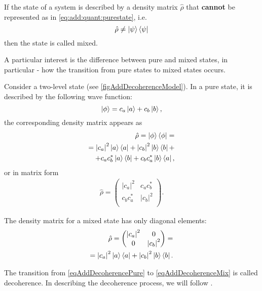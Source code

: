 \begin{definition}
If the state of a system is described by a density matrix $\hat{\rho}$ that \textbf{cannot} be represented as in \eqref{eq:add:quant:purestate}, i.e. 
\[
\hat{\rho} \ne \ket{\psi}\bra{\psi}
\]
then the state is called mixed.
\end{definition}

A particular interest is the difference between pure and mixed states, in particular - how the transition from pure states to mixed states occurs.

Consider a two-level state (see \autoref{figAddDecoherenceModel}). In a pure state, it is described by the following wave function:
\begin{equation}
\left|\phi\right> = c_a \ket{a } + c_b \ket{b},
\nonumber
\end{equation}
the corresponding density matrix appears as
\begin{eqnarray}
\hat{\rho} = \left|\phi\right>\left<\phi\right| =
\nonumber \\
= 
\left|c_a\right|^2 \ket{a}\bra{a} + 
\left|c_b\right|^2 \ket{b}\bra{b} +
\nonumber \\
+
c_a c_b^{\ast}\ket{a}\bra{b} +
c_b c_a^{\ast}\ket{b}\bra{a},
\label{eqAddDecoherencePure}
\end{eqnarray}
or in matrix form
\begin{eqnarray}
\hat{\rho} = 
\begin{pmatrix}
\left|c_a\right|^2 & c_a c_b^{\ast} \\
c_b c_a^{\ast} & \left|c_b\right|^2 \\
\end{pmatrix}.
\nonumber
\end{eqnarray}

The density matrix 
for a mixed state has only diagonal elements:
\begin{eqnarray}
\hat{\rho} = 
\begin{pmatrix}
\left|c_a\right|^2 & 0 \\
0 & \left|c_b\right|^2 \\
\end{pmatrix} = 
\nonumber \\
=
\left|c_a\right|^2 \ket{a}\bra{a} + 
\left|c_b\right|^2 \ket{b}\bra{b}.
\label{eqAddDecoherenceMix}
\end{eqnarray}



The transition from \eqref{eqAddDecoherencePure} to \eqref{eqAddDecoherenceMix} is called decoherence.
In describing the decoherence process, we will follow \cite{bMensky2001}. 

